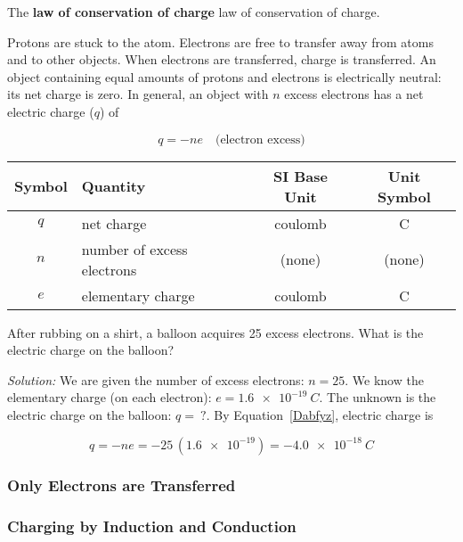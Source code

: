 \documentclass[dvipsnames]{article}
\begin{document}
The \textbf{\gls{law of conservation of charge}} \glsdesc{law of conservation of charge}.

Protons are stuck to the atom. Electrons are free to transfer away from atoms and to other objects. When electrons are transferred, charge is transferred. An object containing equal amounts of protons and electrons is electrically neutral: its net charge is zero. In general, an object with $n$ excess electrons has a net electric charge ($q$) of

\begin{equation} \label{Dabfyz}
    q = - ne \hspace{1em} \text{(electron excess)}
\end{equation}

\begin{center}
    \begin{tabular}{cl|cc}
    \hline
    \textbf{Symbol} & \textbf{Quantity} & \textbf{SI Base Unit} & \textbf{Unit Symbol}  \\
    \hline\hline
    \rule{0pt}{2.5ex}
        $q$ & net charge & coulomb & \si{\coulomb}\\
        $n$ & number of excess electrons & (none) & (none) \\
        $e$ & elementary charge & coulomb & \si{\coulomb} \\
    \hline
    \end{tabular}
\end{center}

\begin{example}
    After rubbing on a shirt, a balloon acquires 25 excess electrons. What is the electric charge on the balloon?
\end{example}

\textit{Solution:}
We are given the number of excess electrons: $n = 25$. We know the elementary charge (on each electron): $e = \SI{1.6e-19}{C}$. The unknown is the electric charge on the balloon: $q =\ ?$. By Equation~\ref{Dabfyz}, electric charge is

\begin{equation*}
    q = - n e = -25\,(\num{1.6e-19}) = \SI{-4.0e-18}{C}
\end{equation*}

\subsubsection{Only Electrons are Transferred}

\subsubsection{Charging by Induction and Conduction}
\end{document}
